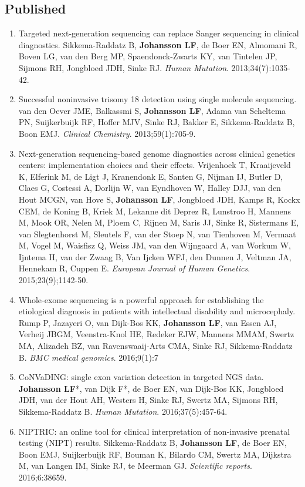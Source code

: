 \begin{appendices}
	\section*{Published}
	\begin{enumerate}
		\item Targeted next-generation sequencing can replace Sanger sequencing in clinical diagnostics. Sikkema-Raddatz B, \textbf{Johansson LF}, de Boer EN, Almomani R, Boven LG, van den Berg MP, Spaendonck-Zwarts KY, van Tintelen JP, Sijmons RH, Jongbloed JDH, Sinke RJ. \textsl{Human Mutation}. 2013;34(7):1035-42.
	\item Successful noninvasive trisomy 18 detection using single molecule sequencing. van den Oever JME, Balkassmi S, \textbf{Johansson LF}, Adama van Scheltema PN, Suijkerbuijk RF, Hoffer MJV, Sinke RJ, Bakker E, Sikkema-Raddatz B,  Boon EMJ. \textsl{Clinical Chemistry}. 2013;59(1):705-9.
	\item Next-generation sequencing-based genome diagnostics across clinical genetics centers: implementation choices and their effects. Vrijenhoek T, Kraaijeveld K, Elferink M, de Ligt J,  Kranendonk E, Santen G, Nijman IJ, Butler D, Claes G, Costessi A, Dorlijn W, van Eyndhoven W, Halley DJJ, van den Hout MCGN, van Hove S, \textbf{Johansson LF}, Jongbloed JDH, Kamps R, Kockx CEM, de Koning B, Kriek M, Lekanne dit Deprez R, Lunstroo H, Mannens M, Mook OR, Nelen M, Ploem C, Rijnen M, Saris JJ, Sinke R, Sistermans E, van Slegtenhorst M, Sleutels F, van der Stoep N, van Tienhoven M, Vermaat M, Vogel M, Waisfisz Q, Weiss JM, van den Wijngaard A, van Workum W, Ijntema H, van der Zwaag B, Van Ijcken WFJ, den Dunnen J, Veltman JA, Hennekam R, Cuppen E. \textsl{European Journal of Human Genetics}. 2015;23(9);1142-50.
	\item Whole-exome sequencing is a powerful approach for establishing the etiological diagnosis in patients with intellectual disability and microcephaly. Rump P, Jazayeri O, van Dijk-Bos KK, \textbf{Johansson LF}, van Essen AJ, Verheij JBGM, Veenstra-Knol HE, Redeker EJW, Mannens MMAM, Swertz MA, Alizadeh BZ, van Ravenswaaij-Arts CMA, Sinke RJ, Sikkema-Raddatz B. \textsl{BMC medical genomics}. 2016;9(1):7
	\item CoNVaDING: single exon variation detection in targeted NGS data. \textbf{Johansson LF}*, van Dijk F*, de Boer EN, van Dijk-Bos KK, Jongbloed JDH, van der Hout AH, Westers H, Sinke RJ, Swertz MA, Sijmons RH, Sikkema-Raddatz B. \textsl{Human Mutation}. 2016;37(5):457-64.
	\item NIPTRIC: an online tool for clinical interpretation of non-invasive prenatal testing (NIPT) results. Sikkema-Raddatz B, \textbf{Johansson LF}, de Boer EN, Boon EMJ, Suijkerbuijk RF, Bouman K, Bilardo CM, Swertz MA, Dijkstra M, van Langen IM, Sinke RJ, te Meerman GJ. \textsl{Scientific reports}. 2016;6:38659.

\end{enumerate}
\end{appendices}
